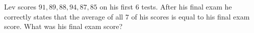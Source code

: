 Lev scores $91,89,88,94,87,85$ on his first $6$ tests. After his final exam he correctly states that the average of all $7$ of his scores is equal to his final exam score. What was his final exam score?
